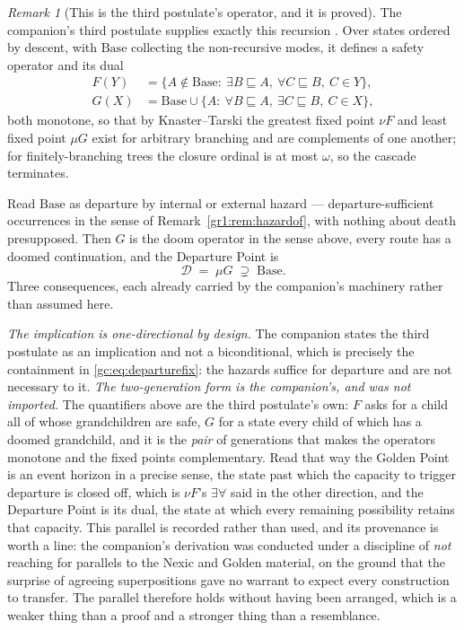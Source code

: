 \documentclass[11pt]{article}
\numberwithin{equation}{section}
\theoremstyle{plain}
\theoremstyle{definition}
\theoremstyle{remark}
\newtheorem{remark}[theorem]{Remark}
\begin{document}
\begin{remark}[This is the third postulate's operator, and it is proved]
\label{gc:rem:thirdpostulate}
The companion's third postulate supplies exactly this recursion
\cite{Aethus}. Over states ordered by descent, with $\mathrm{Base}$
collecting the non-recursive modes, it defines a safety operator and
its dual
\begin{align*}
F(Y)&=\bigl\{A\notin\mathrm{Base}:\ \exists B\sqsubseteq A,\
\forall C\sqsubseteq B,\ C\in Y\bigr\},\\
G(X)&=\mathrm{Base}\cup\bigl\{A:\ \forall B\sqsubseteq A,\
\exists C\sqsubseteq B,\ C\in X\bigr\},
\end{align*}
both monotone, so that by Knaster--Tarski the greatest fixed point
$\nu F$ and least fixed point $\mu G$ exist for arbitrary branching and
are complements of one another; for finitely-branching trees the
closure ordinal is at most $\omega$, so the cascade terminates.

Read $\mathrm{Base}$ as departure by internal or external hazard
--- departure-sufficient occurrences in the sense of
Remark~\ref{gr1:rem:hazardof}, with nothing about death presupposed.
Then $G$ is the doom operator in the sense above, every route has a
doomed continuation, and the Departure Point is
\begin{equation}\label{gc:eq:departurefix}
\mathcal{D}\;=\;\mu G\;\supsetneq\;\mathrm{Base}.
\end{equation}
Three consequences, each already carried by the companion's
machinery rather than assumed here.

\emph{The implication is one-directional by design.} The companion
states the third postulate as an implication and not a biconditional,
which is precisely the containment in \eqref{gc:eq:departurefix}: the
hazards suffice for departure and are not necessary to it. \emph{The two-generation form is the companion's, and was not imported.}
The quantifiers above are the third postulate's own: $F$ asks for a child
all of whose grandchildren are safe, $G$ for a state every child of which
has a doomed grandchild, and it is the \emph{pair} of generations that
makes the operators monotone and the fixed points complementary. Read
that way the Golden Point is an event horizon in a precise sense, the
state past which the capacity to trigger departure is closed off, which
is $\nu F$'s $\exists\forall$ said in the other direction, and the
Departure Point is its dual, the state at which every remaining
possibility retains that capacity. This parallel is recorded rather than
used, and its provenance is worth a line: the companion's derivation was
conducted under a discipline of \emph{not} reaching for parallels to the
Nexic and Golden material, on the ground that the surprise of agreeing
superpositions gave no warrant to expect every construction to transfer.
The parallel therefore holds without having been arranged, which is a
weaker thing than a proof and a stronger thing than a resemblance.


\end{remark}
\end{document}
